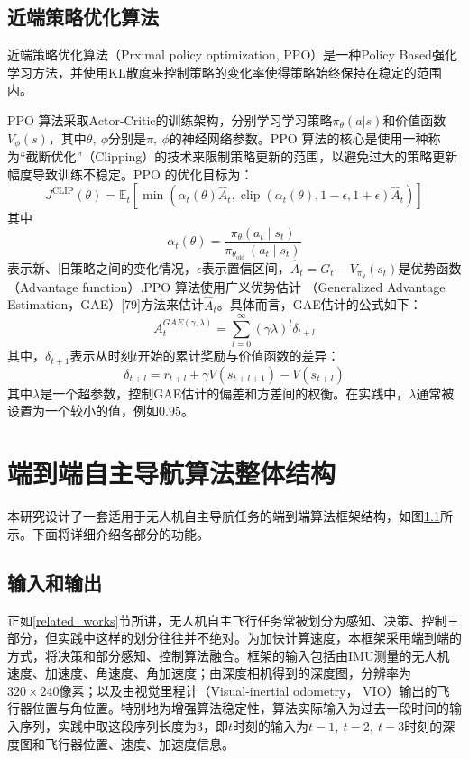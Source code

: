 \subsection{近端策略优化算法}
\label{PPO_alg}
近端策略优化算法\cite{schulman2017proximal}（Prximal policy optimization, PPO）是一种Policy Based强化学习方法，并使用KL散度来控制策略的变化率使得策略始终保持在稳定的范围内。

PPO 算法采取Actor-Critic的训练架构，分别学习学习策略$\pi_\theta(a|s)$和价值函数$V_\phi(s)$，其中$\theta,\ \phi$分别是$\pi,\ \phi$的神经网络参数。PPO 算法的核心是使用一种称为“截断优化”（Clipping）的技术来限制策略更新的范围，以避免过大的策略更新幅度导致训练不稳定。PPO 的优化目标为：
\[
  J^{\mathrm{CLIP}}(\theta)=\mathbb{E}_{t}\left[\min \left(\alpha_{t}(\theta) \hat{A}_{t}, \operatorname{clip}\left(\alpha_{t}(\theta), 1-\epsilon, 1+\epsilon\right) \hat{A}_{t}\right)\right]
\]
其中
\[
  \alpha_{t}(\theta)=\frac{\pi_{\theta}\left(a_{t} \mid s_{t}\right)}{\pi_{\theta_{\text {old }}}\left(a_{t} \mid s_{t}\right)}
\]
表示新、旧策略之间的变化情况，$\epsilon$表示置信区间，$\hat{A}_t = G_t-V_{\pi_\theta}(s_t)$是优势函数（Advantage function）.PPO 算法使用广义优势估计
（Generalized Advantage Estimation，GAE）[79]方法来估计$\hat{A}_t$。具体而言，GAE估计的公式如下：
\[
  A_{t}^{G A E(\gamma, \lambda)}=\sum_{l=0}^{\infty}(\gamma \lambda)^{l} \delta_{t+l}
\]
其中，$\delta_{t+1}$表示从时刻$t$开始的累计奖励与价值函数的差异：
\[
  \delta_{t+l}=r_{t+l}+\gamma V\left(s_{t+l+1}\right)-V\left(s_{t+l}\right)
\]
其中$\lambda$是一个超参数，控制GAE估计的偏差和方差间的权衡。在实践中，$\lambda$通常被设置为一个较小的值，例如$0.95$。

\section{端到端自主导航算法整体结构}
本研究设计了一套适用于无人机自主导航任务的端到端算法框架结构，如图\ref{}所示。下面将详细介绍各部分的功能。

\subsection{输入和输出}
正如\ref{related_works}节所讲，无人机自主飞行任务常被划分为感知、决策、控制三部分，但实践中这样的划分往往并不绝对。为加快计算速度，本框架采用端到端的方式，将决策和部分感知、控制算法融合。框架的输入包括由IMU测量的无人机速度、加速度、角速度、角加速度；由深度相机得到的深度图，分辨率为$320\times240$像素；以及由视觉里程计（Visual-inertial odometry， VIO）输出的飞行器位置与角位置。特别地为增强算法稳定性，算法实际输入为过去一段时间的输入序列，实践中取这段序列长度为3，即$t$时刻的输入为$t-1,\ t-2,\ t-3$时刻的深度图和飞行器位置、速度、加速度信息。

